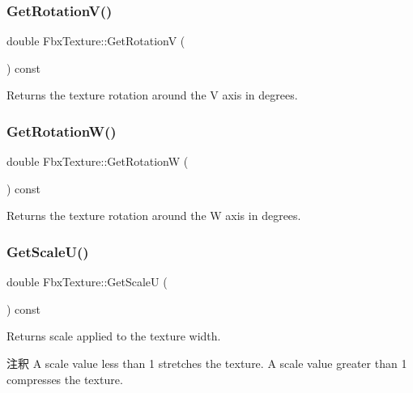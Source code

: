 \subsubsection{\texorpdfstring{Get\+Rotation\+V()}{GetRotationV()}}
{\footnotesize\ttfamily double Fbx\+Texture\+::\+Get\+RotationV (\begin{DoxyParamCaption}{ }\end{DoxyParamCaption}) const}



Returns the texture rotation around the V axis in degrees. 

\mbox{\label{class_fbx_texture_a5f320c1d648dcf09323c7df39cfbb4c8}} 
\subsubsection{\texorpdfstring{Get\+Rotation\+W()}{GetRotationW()}}
{\footnotesize\ttfamily double Fbx\+Texture\+::\+Get\+RotationW (\begin{DoxyParamCaption}{ }\end{DoxyParamCaption}) const}



Returns the texture rotation around the W axis in degrees. 

\mbox{\label{class_fbx_texture_a2ca0428f36ddd73442891a73c15e4227}} 
\subsubsection{\texorpdfstring{Get\+Scale\+U()}{GetScaleU()}}
{\footnotesize\ttfamily double Fbx\+Texture\+::\+Get\+ScaleU (\begin{DoxyParamCaption}{ }\end{DoxyParamCaption}) const}

Returns scale applied to the texture width. \begin{DoxyRemark}{注釈}
A scale value less than 1 stretches the texture. A scale value greater than 1 compresses the texture. 
\end{DoxyRemark}
\mbox{\label{class_fbx_texture_a37edad25de26090cde868b88b9e89a77}} 
